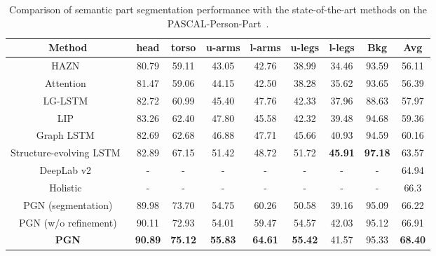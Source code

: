 \documentclass[runningheads]{llncs}
\begin{document}
\begin{table*}[t]
\centering
\small
\caption{Comparison of semantic part segmentation performance with the state-of-the-art methods on the PASCAL-Person-Part~\cite{chen2014detect}.}
\begin{tabular}{ccccccccc}
\toprule[0.7pt]
   Method                                         &  head  &  torso  &  u-arms &  l-arms &  u-legs &  l-legs &  Bkg   &  Avg    \\ \hline
   HAZN~\cite{xia2015zoom}                        & 80.79  &  59.11  &  43.05  &  42.76  &  38.99  &  34.46  &  93.59 &  56.11  \\  
   Attention~\cite{chen2015attention}             & 81.47  &  59.06  &  44.15  &  42.50  &  38.28  &  35.62  &  93.65 &  56.39  \\ 
   LG-LSTM~\cite{liang2015semantic}               & 82.72  &  60.99  &  45.40  &  47.76  &  42.33  &  37.96  &  88.63 &  57.97  \\     
   LIP~\cite{Gong_2017_CVPR}                      & 83.26  &  62.40  &  47.80  &  45.58  &  42.32  &  39.48  &  94.68 &  59.36  \\ 
   Graph LSTM~\cite{liang2016semantic}            & 82.69  &  62.68  &  46.88  &  47.71  &  45.66  &  40.93  &  94.59 &  60.16  \\
   Structure-evolving LSTM~\cite{Liang_2017_CVPR} & 82.89  &  67.15  &  51.42  &  48.72  &  51.72  & \textbf{45.91} & \textbf{97.18} &  63.57  \\
   DeepLab v2~\cite{chen2016deeplab}              &   -    &     -   &   -     &    -    &   -     &    -    &   -    &  64.94  \\
   Holistic~\cite{li2017holistic}                 &   -    &     -   &   -     &    -    &   -     &    -    &   -    &  66.3   \\\hline 
   PGN (segmentation)                             & 89.98  &  73.70  & 54.75   &  60.26  &  50.58  &  39.16  &  95.09 &  66.22  \\
   PGN (w/o refinement)                           & 90.11  &  72.93  & 54.01   &  59.47  &  54.57  &  42.03  &  95.12 &  66.91  \\\hline 
   \textbf{PGN}                               & \textbf{90.89}  &  \textbf{75.12}  &  \textbf{55.83}  &  \textbf{64.61}  &  
                                                  \textbf{55.42}  &  41.57  &  95.33 &  \textbf{68.40}   \\
\toprule[0.7pt]
\end{tabular}
\vspace{-10mm}
\label{tab: pascal}
\end{table*}
\end{document}
